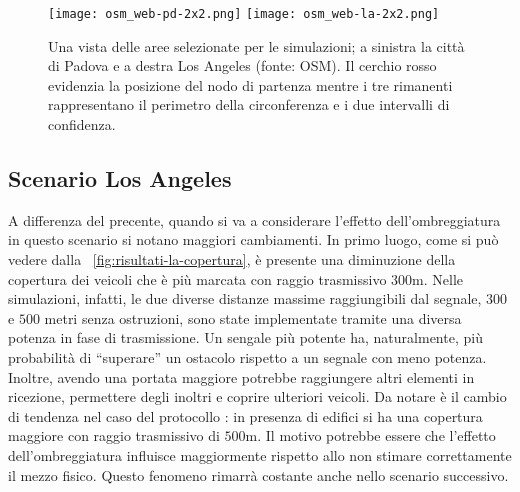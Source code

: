 %
\begin{figure}[htbp]
	\centering
		\texttt{[image: osm\_web-pd-2x2.png]}
		\vspace{10pt}
		\texttt{[image: osm\_web-la-2x2.png]}
\caption{Una vista delle aree selezionate per le simulazioni; a sinistra la città di Padova e a destra Los Angeles (fonte: OSM).
Il cerchio rosso evidenzia la posizione del nodo di partenza mentre i tre rimanenti rappresentano il perimetro della circonferenza
e i due intervalli di confidenza.\label{fig:scenari-la-pd-osm}}
\end{figure}
%
\subsection{Scenario Los Angeles}\label{subsec:risultati-la}
A differenza del precente, quando si va a considerare l'effetto dell'ombreggiatura in questo scenario
si notano maggiori cambiamenti.
In primo luogo, come si può vedere dalla \figurename~\ref{fig:risultati-la-copertura},
è presente una diminuzione della copertura dei veicoli che è più marcata con raggio trasmissivo $300$m.
Nelle simulazioni, infatti, le due diverse distanze massime raggiungibili dal segnale,
$300$ e $500$ metri senza ostruzioni, sono state implementate tramite una diversa potenza in fase di trasmissione.
Un sengale più potente ha, naturalmente,
più probabilità di ``superare'' un ostacolo rispetto a un segnale con meno potenza.
Inoltre, avendo una portata maggiore potrebbe raggiungere altri elementi in ricezione,
permettere degli inoltri e coprire ulteriori veicoli.
Da notare è il cambio di tendenza nel caso del protocollo \statica{}:
in presenza di edifici si ha una copertura maggiore con raggio trasmissivo di $500$m.
Il motivo potrebbe essere che l'effetto dell'ombreggiatura influisce maggiormente rispetto
allo non stimare correttamente il mezzo fisico.
Questo fenomeno rimarrà costante anche nello scenario successivo.

